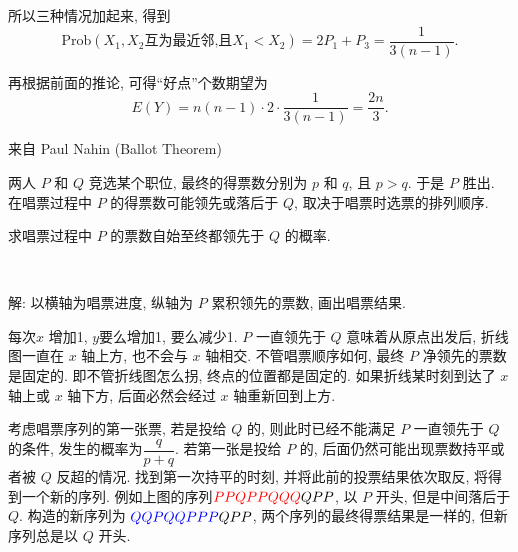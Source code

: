 所以三种情况加起来, 得到
\[\mathrm{Prob}(X_1,X_2\text{互为最近邻,且}X_1<X_2) = 2P_1 + P_3 = \frac{1}{3(n-1)} .\]

再根据前面的推论, 可得``好点''个数期望为 
\[E(Y) = n(n-1)\cdot 2\cdot\frac{1}{3(n-1)} = \frac{2n}{3} .\]

\newpage
\noindent 来自 Paul Nahin (Ballot Theorem)

两人 $P$ 和 $Q$ 竞选某个职位, 最终的得票数分别为 $p$ 和 $q$, 且 $p>q$. 于是 $P$ 胜出. 在唱票过程中 $P$ 的得票数可能领先或落后于 $Q$, 取决于唱票时选票的排列顺序. 

求唱票过程中 $P$ 的票数自始至终都领先于 $Q$ 的概率.

~

解: 以横轴为唱票进度, 纵轴为 $P$ 累积领先的票数, 画出唱票结果.
\begin{figure}[htbp]
\centering
{}
\end{figure}

每次$x$ 增加1, $y$要么增加1, 要么减少1. $P$ 一直领先于 $Q$ 意味着从原点出发后, 折线图一直在 $x$ 轴上方, 也不会与 $x$ 轴相交. 不管唱票顺序如何, 最终 $P$ 净领先的票数是固定的. 即不管折线图怎么拐, 终点的位置都是固定的. 如果折线某时刻到达了 $x$ 轴上或 $x$ 轴下方, 后面必然会经过 $x$ 轴重新回到上方.

考虑唱票序列的第一张票, 若是投给 $Q$ 的, 则此时已经不能满足 $P$ 一直领先于 $Q$ 的条件, 发生的概率为$\dfrac{q}{p+q}$. 若第一张是投给 $P$ 的, 后面仍然可能出现票数持平或者被 $Q$ 反超的情况. 找到第一次持平的时刻, 并将此前的投票结果依次取反, 将得到一个新的序列. 例如上图的序列$\color{red}{PPQPPQQQ}\color{black}{QPP}$, 以 $P$ 开头, 但是中间落后于 $Q$. 构造的新序列为 $\color{blue}{QQPQQPPP}\color{black}{QPP}$, 两个序列的最终得票结果是一样的, 但新序列总是以 $Q$ 开头. 

